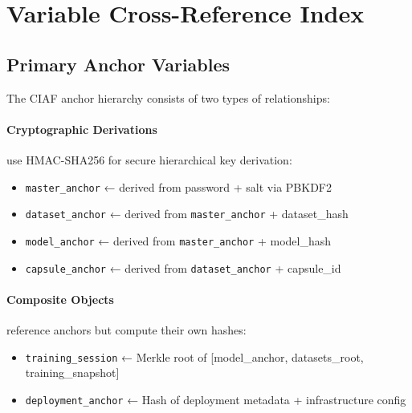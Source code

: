 \documentclass[12pt,a4paper]{article}
\begin{document}
\section{Variable Cross-Reference Index}

\subsection{Primary Anchor Variables}

The CIAF anchor hierarchy consists of two types of relationships:

\paragraph{Cryptographic Derivations} use HMAC-SHA256 for secure hierarchical key derivation:
\begin{itemize}
\item \texttt{master\_anchor} ← derived from password + salt via PBKDF2
\item \texttt{dataset\_anchor} ← derived from \texttt{master\_anchor} + dataset\_hash
\item \texttt{model\_anchor} ← derived from \texttt{master\_anchor} + model\_hash  
\item \texttt{capsule\_anchor} ← derived from \texttt{dataset\_anchor} + capsule\_id
\end{itemize}

\paragraph{Composite Objects} reference anchors but compute their own hashes:
\begin{itemize}
\item \texttt{training\_session} ← Merkle root of [model\_anchor, datasets\_root, \linebreak training\_snapshot]
\item \texttt{deployment\_anchor} ← Hash of deployment metadata + infrastructure config
\end{itemize}
\end{document}
